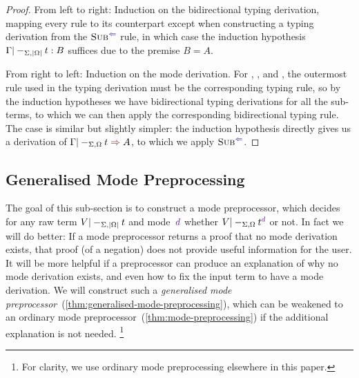 \begin{proof}
From left to right:
Induction on the bidirectional typing derivation, mapping every rule to its counterpart except when constructing a typing derivation from the $\ChkRule{Sub}$ rule, in which case the induction hypothesis $\Gamma |-_{\Sigma,\left|\Omega\right|} t : B$ suffices due to the premise $B = A$.

From right to left:
Induction on the mode derivation.
For , , and , the outermost rule used in the typing derivation must be the corresponding typing rule, so by the induction hypotheses we have bidirectional typing derivations for all the sub-terms, to which we can then apply the corresponding bidirectional typing rule.
The  case is similar but slightly simpler: the induction hypothesis directly gives us a derivation of $\Gamma |-_{\Sigma,\Omega} t \syn A$, to which we apply $\ChkRule{Sub}$.
\end{proof}


\subsection{Generalised Mode Preprocessing}
\label{sec:mode-preprocessing}

The goal of this sub-section is to construct a mode preprocessor, which decides for any raw term $V |-_{\Sigma,\left|\Omega\right|} t$ and mode~$\dir d$ whether $V |-_{\Sigma,\Omega} t^\dir{d}$ or not.
In fact we will do better:
If a mode preprocessor returns a proof that no mode derivation exists, that proof (of a negation) does not provide useful information for the user.
It will be more helpful if a preprocessor can produce an explanation of why no mode derivation exists, and even how to fix the input term to have a mode derivation.
We will construct such a \emph{generalised mode preprocessor}~(\cref{thm:generalised-mode-preprocessing}), which can be weakened to an ordinary mode preprocessor~(\cref{thm:mode-preprocessing}) if the additional explanation is not needed.%
\footnote{For clarity, we use ordinary mode preprocessing elsewhere in this paper.}

